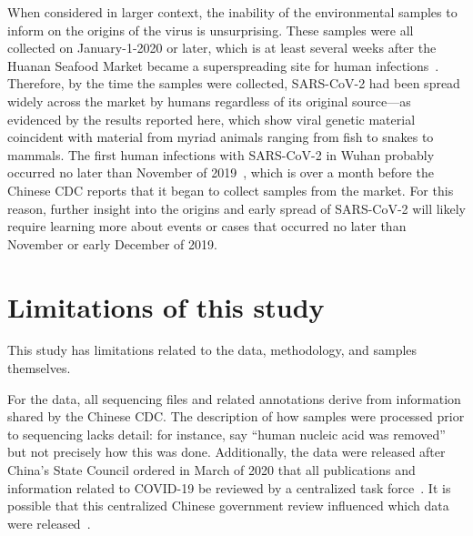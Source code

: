 \documentclass[9pt,twocolumn,twoside]{gsajnl_modified}
\begin{document}
When considered in larger context, the inability of the environmental samples to inform on the origins of the virus is unsurprising.
These samples were all collected on January-1-2020 or later, which is at least several weeks after the Huanan Seafood Market became a superspreading site for human infections~\citep{li2020early}.
Therefore, by the time the samples were collected, SARS-CoV-2 had been spread widely across the market by humans regardless of its original source---as evidenced by the results reported here, which show viral genetic material coincident with material from myriad animals ranging from fish to snakes to mammals. 
The first human infections with SARS-CoV-2 in Wuhan probably occurred no later than November of 2019~\citep{zhang2020viral,van2020emergence,he2020evaluating,pipes2021assessing,pekar2021timing,odni2022,pekar2022molecular}, which is over a month before the Chinese CDC reports that it began to collect samples from the market.
For this reason, further insight into the origins and early spread of SARS-CoV-2 will likely require learning more about events or cases that occurred no later than November or early December of 2019. 


\section{Limitations of this study}
This study has limitations related to the data, methodology, and samples themselves.

For the data, all sequencing files and related annotations derive from information shared by the Chinese CDC.
The description of how samples were processed prior to sequencing lacks detail: for instance, \citet{liu2023surveillance} say ``human nucleic acid was removed'' but not precisely how this was done.
Additionally, the data were released after China's State Council ordered in March of 2020 that all publications and information related to COVID-19 be reviewed by a centralized task force~\citep{kang2020china}.
It is possible that this centralized Chinese government review influenced which data were released~\citep{hvistendahl2023}.
\end{document}
